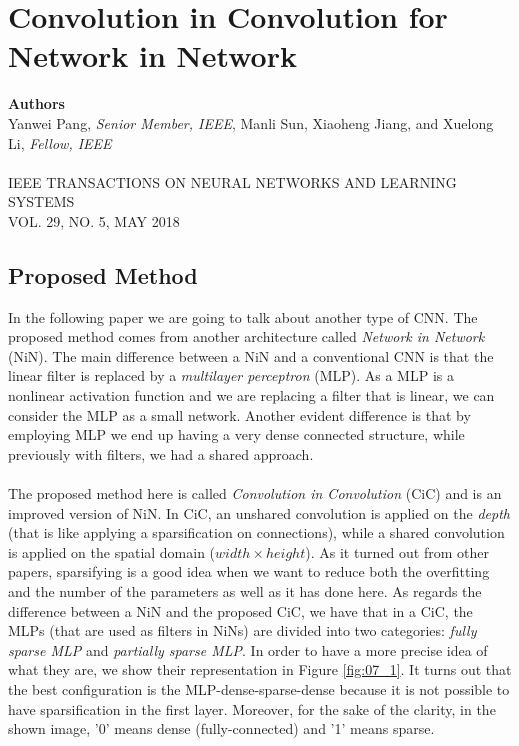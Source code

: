 \chapter{Convolution in Convolution for Network in Network}

{\small \textbf{Authors}\\
Yanwei Pang, \textit{Senior Member, IEEE}, Manli Sun, Xiaoheng Jiang, and Xuelong Li, \textit{Fellow, IEEE}\\ \\
IEEE TRANSACTIONS ON NEURAL NETWORKS AND LEARNING SYSTEMS\\VOL. 29, NO. 5, MAY 2018}

\section{Proposed Method}

In the following paper we are going to talk about another type of CNN. The proposed method comes from another architecture called \textit{Network in Network} (NiN). The main difference between a NiN and a conventional CNN is that the linear filter is replaced by a \textit{multilayer perceptron} (MLP). As a MLP is a nonlinear activation function and we are replacing a filter that is linear, we can consider the MLP as a small network. Another evident difference is that by employing MLP we end up having a very dense connected structure, while previously with filters, we had a shared approach.\\ \\
The proposed method here is called \textit{Convolution in Convolution} (CiC) and is an improved version of NiN. In CiC, an unshared convolution is applied on the \textit{depth} (that is like applying a sparsification on connections), while a shared convolution is applied on the spatial domain (\textit{$width \times height$}). As it turned out from other papers, sparsifying is a good idea when we want to reduce both the overfitting and the number of the parameters as well as it has done here. As regards the difference between a NiN and the proposed CiC, we have that in a CiC, the MLPs (that are used as filters in NiNs) are divided into two categories: \textit{fully sparse MLP} and \textit{partially sparse MLP}. In order to have a more precise idea of what they are, we show their representation in Figure \ref{fig:07_1}. It turns out that the best configuration is the MLP-dense-sparse-dense because it is not possible to have sparsification in the first layer. Moreover, for the sake of the clarity, in the shown image, '0' means dense (fully-connected) and '1' means sparse.\\

